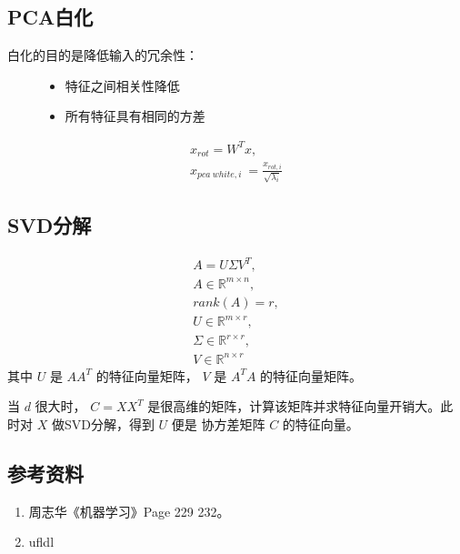 \documentclass[letterpaper,10pt,english]{sphinxmanual}
\begin{document}
\subsection{PCA白化}
\label{\detokenize{machineLearning/03_pca:id3}}\begin{description}
\item[{白化的目的是降低输入的冗余性：}] \leavevmode\begin{itemize}
\item {} 
特征之间相关性降低

\item {} 
所有特征具有相同的方差

\end{itemize}

\end{description}
\begin{equation*}
\begin{split}x_{rot} = W^T x, \\
x_{pca\ white, i} \ = \frac{x_{rot, i}}{\sqrt{\lambda_i}}\end{split}
\end{equation*}

\subsection{SVD分解}
\label{\detokenize{machineLearning/03_pca:svd}}\begin{equation*}
\begin{split}A = U \Sigma V^T,\\
A \in \mathbb{R}^{m \times n}, \\
rank(A) = r,\\
U \in \mathbb{R}^{m \times r}, \\
\Sigma \in \mathbb{R}^{r \times r}, \\
V \in \mathbb{R}^{n \times r}\end{split}
\end{equation*}
其中 \(U\) 是 \(AA^T\) 的特征向量矩阵， \(V\) 是 \(A^TA\) 的特征向量矩阵。

当 \(d\) 很大时， \(C=XX^T\) 是很高维的矩阵，计算该矩阵并求特征向量开销大。此时对 \(X\) 做SVD分解，得到 \(U\) 便是
协方差矩阵 \(C\) 的特征向量。


\subsection{参考资料}
\label{\detokenize{machineLearning/03_pca:id4}}\begin{enumerate}
\item {} 
周志华《机器学习》Page 229 \textendash{} 232。

\item {} 
ufldl

\end{enumerate}
\begin{quote}

\end{quote}
\end{document}
